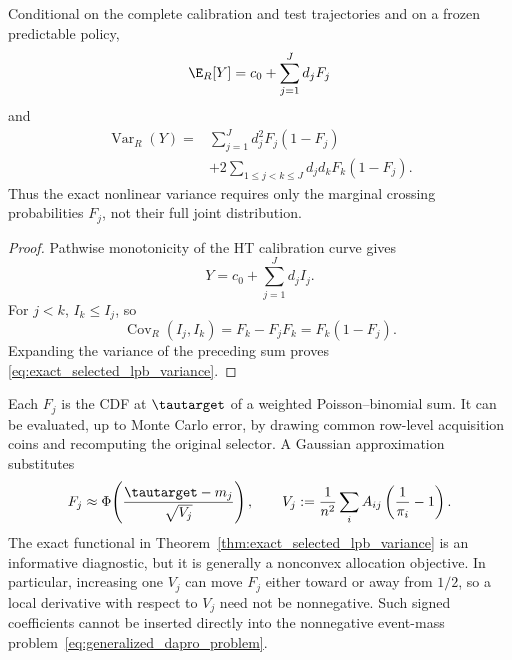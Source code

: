 \begin{theorem}
\label{thm:exact_selected_lpb_variance}
Conditional on the complete calibration and test trajectories and on a
frozen predictable policy,
\begin{equation}
    \E_R[Y]=c_0+\sum_{j=1}^Jd_jF_j
    \label{eq:lpb_selected_coverage_mean}
\end{equation}
and
\begin{equation}
\begin{split}
    \operatorname{Var}_R(Y)
    ={}&\sum_{j=1}^Jd_j^2F_j(1-F_j)\\
      &+2\sum_{1\leq j<k\leq J}
        d_jd_kF_k(1-F_j).
    \label{eq:exact_selected_lpb_variance}
\end{split}
\end{equation}
Thus the exact nonlinear variance requires only the marginal crossing
probabilities $F_j$, not their full joint distribution.
\end{theorem}

\begin{proof}
Pathwise monotonicity of the HT calibration curve gives
\begin{equation}
    Y=c_0+\sum_{j=1}^Jd_jI_j.
\end{equation}
For $j<k$, $I_k\leq I_j$, so
\begin{equation}
    \operatorname{Cov}_R(I_j,I_k)=F_k-F_jF_k=F_k(1-F_j).
\end{equation}
Expanding the variance of the preceding sum proves
\eqref{eq:exact_selected_lpb_variance}.
\end{proof}

Each $F_j$ is the CDF at $\tautarget$ of a weighted Poisson--binomial sum.
It can be evaluated, up to Monte Carlo error, by drawing common row-level
acquisition coins and recomputing the original selector.  A Gaussian
approximation substitutes
\begin{equation}
    F_j\approx\Phi\!\left(
      \frac{\tautarget-m_j}{\sqrt{V_j}}
    \right),
    \qquad
    V_j:=\frac{1}{n^2}\sum_i
      A_{ij}\left(\frac{1}{\pi_i}-1\right).
    \label{eq:lpb_gaussian_crossing}
\end{equation}
The exact functional in
Theorem~\ref{thm:exact_selected_lpb_variance} is an informative diagnostic,
but it is generally a nonconvex allocation objective.  In particular,
increasing one $V_j$ can move $F_j$ either toward or away from $1/2$, so a
local derivative with respect to $V_j$ need not be nonnegative.  Such signed
coefficients cannot be inserted directly into the nonnegative event-mass
problem~\eqref{eq:generalized_dapro_problem}.

